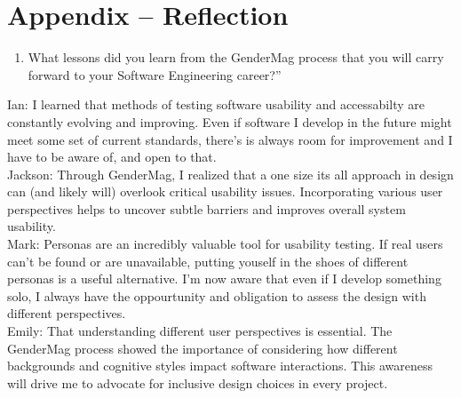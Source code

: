\documentclass[12pt, titlepage]{article}
\begin{document}
\newpage
\section*{Appendix -- Reflection}
\begin{enumerate}
  \item What lessons did you learn from the GenderMag process that you will carry forward to your Software Engineering career?”
\end{enumerate}

Ian: I learned that methods of testing software usability and accessabilty are constantly evolving and improving. Even if software I
develop in the future might meet some set of current standards, there's is always room for improvement and I have to be aware of, and open to that. \\

Jackson: Through GenderMag, I realized that a one size its all approach in design can (and likely will) overlook critical usability 
issues. Incorporating various user perspectives helps to uncover subtle barriers and improves overall system usability. \\

Mark: Personas are an incredibly valuable tool for usability testing. If real users can't be found or are unavailable, putting youself in the
shoes of different personas is a useful alternative. I'm now aware that even if I develop something solo, I always have the oppourtunity and obligation
to assess the design with different perspectives. \\

Emily: That understanding different user perspectives is essential. The GenderMag process showed the importance of considering 
how different backgrounds and cognitive styles impact software interactions. This awareness will drive me to advocate for inclusive 
design choices in every project. \\
\end{document}
